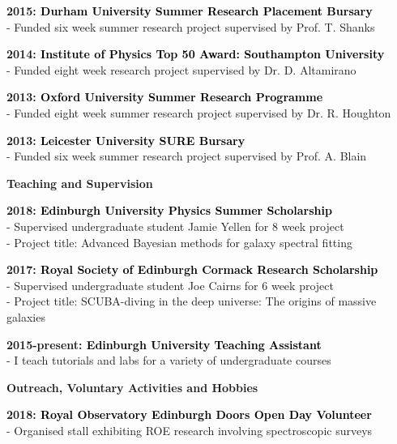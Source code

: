 \documentclass[a4paper,11pt,final]{memoir}
\newcommand{\Sep}{\vspace{1.5em}}
\newcommand{\SmallSep}{\vspace{0.5em}}
\newcommand{\CVSection}[1]
	{\Large\textbf{#1}\par
	\SmallSep\normalsize\normalfont}
\newcommand{\CVItem}[1]
	{\textbf{\color{RoyalBlue} #1}}
\begin{document}
\CVItem{2015: \textcolor{black}{Durham University Summer Research Placement Bursary}}\\
 - Funded six week summer research project supervised by Prof. T. Shanks
 
\SmallSep

\CVItem{2014: \textcolor{black}{Institute of Physics Top 50 Award: Southampton University}}\\
 - Funded eight week research project supervised by Dr. D. Altamirano
 
\SmallSep

\CVItem{2013: \textcolor{black}{Oxford University Summer Research Programme}}\\
 - Funded eight week summer research project supervised by Dr. R. Houghton
 
\SmallSep

\CVItem{2013: \textcolor{black}{Leicester University SURE Bursary}}\\
 - Funded six week summer research project supervised by Prof. A. Blain

\Sep

\CVSection{Teaching and Supervision}

\CVItem{2018: \textcolor{black}{Edinburgh University Physics Summer Scholarship}}\\
 - Supervised undergraduate student Jamie Yellen for 8 week project\\
 - Project title: Advanced Bayesian methods for galaxy spectral fitting
 
 \SmallSep
 
\CVItem{2017: \textcolor{black}{Royal Society of Edinburgh Cormack Research Scholarship}}\\
 - Supervised undergraduate student Joe Cairns for 6 week project\\
 - Project title: SCUBA-diving in the deep universe: The origins of massive galaxies
 
\SmallSep

\CVItem{2015-present: \textcolor{black}{Edinburgh University Teaching Assistant}}\\
 - I teach tutorials and labs for a variety of undergraduate courses

\clearpage
\framebreak
\framebreak

\CVSection{Outreach, Voluntary Activities and Hobbies}

\CVItem{2018: \textcolor{black}{Royal Observatory Edinburgh Doors Open Day Volunteer}}\\
 - Organised stall exhibiting ROE research involving spectroscopic surveys
 
\end{document}
